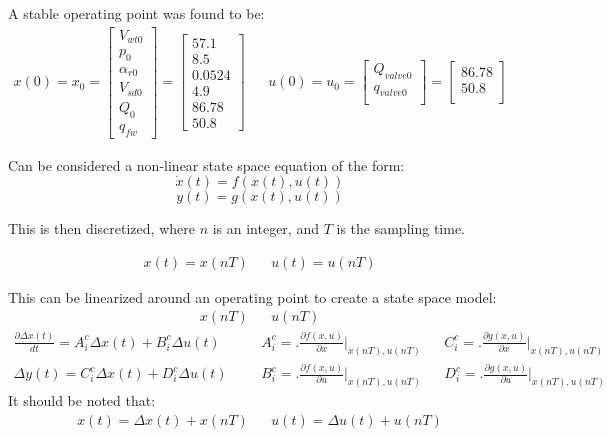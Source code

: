         A stable operating point was found to be:
        $$\begin{matrix}
            x\left (0 \right) = x_0 =   \left [\begin{matrix} V_{wt0}\\ p_{0}\\  \alpha_{r0}\\ V_{sd0}\\ Q_{0}\\ q_{fw}\end{matrix} \right ] = \left [ \begin{matrix} 57.1 \\ 8.5 \\ 0.0524 \\ 4.9 \\ 86.78 \\ 50.8 \end{matrix} \right ]
            & & 
            u\left (0 \right) =  u_0 = \left [\begin{matrix} Q_{valve0} \\ q_{valve0} \\ \end{matrix} \right ] =  \left [\begin{matrix} 86.78\\ 50.8 \\ \end{matrix} \right ]  
        \end{matrix}$$  
        
        \clearpage
        Can be considered a non-linear state space equation of the form:
        $$\dot{x}(t) = f\left ( x(t),u(t) \right )$$
        $$y(t) = g\left ( x(t),u(t) \right )$$
        
        This is then discretized, where $n$ is an integer, and $T$ is the sampling time. 
        
        $$ \begin{matrix} x(t) = x(nT) & & u(t) = u(nT) \end{matrix}$$
        
        This can be linearized around an operating point to create a state space model:
        $$ \begin{matrix} x(nT) & & u(nT) \end{matrix}$$
        $$\begin{matrix}
           \frac{\partial\Delta x(t)}{dt} = A_i^c \Delta x(t) + B_i^c \Delta u(t) & & &  A_i^c = \biggl.\frac{\partial f(x,u)}{\partial x}\biggr|_{x(nT), u(nT)} & & C_i^c = \biggl.\frac{\partial g(x,u)}{\partial x}\biggr|_{x(nT), u(nT)}\\
            \Delta y(t) = C_i^c \Delta x(t) + D_i^c \Delta u(t) & & & B_i^c = \biggl.\frac{\partial f(x,u)}{\partial u}\biggr|_{x(nT), u(nT)} & & D_i^c = \biggl.\frac{\partial g(x,u)}{\partial u}\biggr|_{x(nT), u(nT)}
        \end{matrix}$$
        It should be noted that:
        $$ \begin{matrix} x(t) = \Delta x(t) + x(nT) & & u(t) = \Delta u(t) + u(nT) \end{matrix}$$

